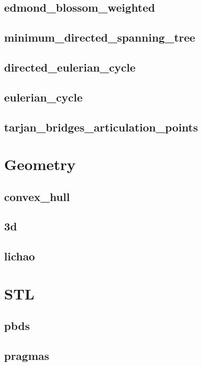 \documentclass[a4paper, twocolumn]{article}
\begin{document}
\subsection{edmond\_blossom\_weighted}

\subsection{minimum\_directed\_spanning\_tree}

\subsection{directed\_eulerian\_cycle}

\subsection{eulerian\_cycle}

\subsection{tarjan\_bridges\_articulation\_points}

\section{Geometry}
\subsection{convex\_hull}

\subsection{3d}

\subsection{lichao}

\section{STL}
\subsection{pbds}

\subsection{pragmas}

\end{document}
